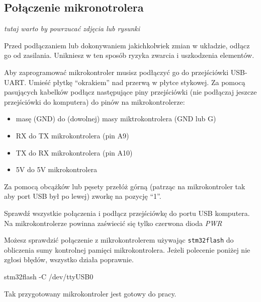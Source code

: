 \documentclass{pdfBooklets}
\begin{document}
\subsection{Połączenie mikronotrolera}
\textit {tutaj warto by powrzucać zdjęcia lub rysunki}

\begin{ProTip}{}
  Przed podłączaniem lub dokonywaniem jakichkolwiek zmian w układzie, odłącz go od zasilania. Unikniesz
  w ten sposób ryzyka zwarcia i uszkodzenia elementów.
\end{ProTip}

Aby zaprogramować mikrokontroler musisz podłączyć go do przejściówki USB-UART. Umieść płytkę ``okrakiem'' nad przerwą
w płytce stykowej. Za pomocą pasujących kabelków podłącz następujące piny przejściówki (nie podłączaj jeszcze
przejściówki do komputera) do pinów na mikrokontrolerze:
\begin{itemize}
\item masę (GND) do (dowolnej) masy miktrokontrolera (GND lub G)
\item RX do TX mikrokontrolera (pin A9)
\item TX do RX mikrokontrolera (pin A10)
\item 5V do 5V mikrokontrolera
\end{itemize}

Za pomocą obcążków lub pęsety przełóż górną (patrząc na mikrokontroler tak aby port USB był po lewej) zworkę na
pozycję ``1''.

Sprawdź wszystkie połączenia i podłącz przejściówkę do portu USB komputera. Na mikrokontrolerze powinna zaświecić się tylko czerwona dioda
\textit{PWR}

Możesz sprawdzić połączenie z mikrokontrolerem używając \Verb$stm32flash$ do obliczenia sumy kontrolnej pamięci mikrokontrolera.
Jeżeli polecenie poniżej nie zgłosi błędów, wszystko działa poprawnie.

\begin{CodeFrame*}[bash]{}
stm32flash -C /dev/ttyUSB0
\end{CodeFrame*}

Tak przygotowany mikrokontroler jest gotowy do pracy.


\end{document}
